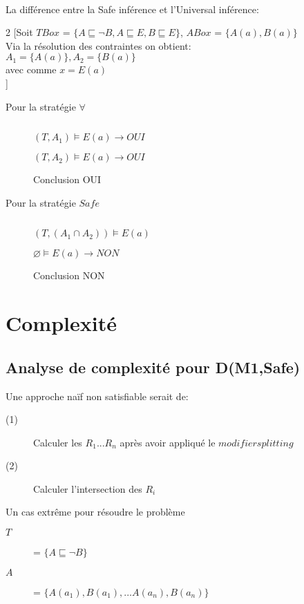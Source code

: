 \pagebreak
\ \\La différence entre la Safe inférence et l'Universal inférence:\\
\begin{multicols}{2}
[Soit $TBox$ = $\{ A \sqsubseteq \neg B, A \sqsubseteq E, B \sqsubseteq E \}$, $ABox$ = $\{A(a), B(a) \}$\\ 
Via la résolution des contraintes on obtient:\\ $A_1 = \{A(a) \}, A_2 = \{ B(a) \}$\\ avec comme $x = E(a)$\\]
\begin{description}
\item[Pour la stratégie $\forall$] $ $
\item[] $(T,A_1) \models E(a) \rightarrow OUI$
\item[] $(T,A_2) \models E(a) \rightarrow OUI$
\item[] Conclusion OUI
\end{description}
\begin{description}
\item[Pour la stratégie $Safe$] $ $
\item[] $(T,(A_1 \cap A_2)) \models E(a) $
\item[] $\varnothing  \models E(a) \rightarrow NON$
\item[] Conclusion NON
\end{description}
\end{multicols}

\chapter{Complexité}\pagebreak
\section{Analyse de complexité pour D(M1,Safe)}

Une approche naïf non satisfiable serait de:
\begin{description}
\item[(1)] Calculer les $R_1 ... R_n$ après avoir appliqué le $modifier splitting$
\item[(2)] Calculer l'intersection des $R_i$
\end{description}

Un cas extrême pour résoudre le problème
\begin{description}
\item[$T$] = $\{ A \sqsubseteq \neg B \}$
\item[$A$] = $\{ A(a_1), B(a_1), ... A(a_n), B(a_n) \}$
\end{description}

